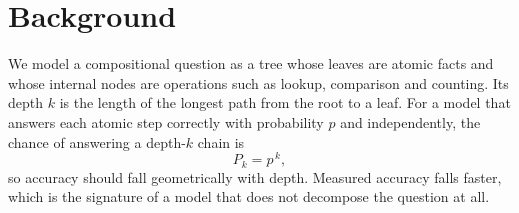 \chapter{Background}
\label{ch:background}

We model a compositional question as a tree whose leaves are atomic facts and whose internal
nodes are operations such as lookup, comparison and counting. Its depth $k$ is the length of the
longest path from the root to a leaf. For a model that answers each atomic step correctly with
probability $p$ and independently, the chance of answering a depth-$k$ chain is
\begin{equation}
  P_k = p^{\,k},
  \label{eq:chain}
\end{equation}
so accuracy should fall geometrically with depth. Measured accuracy falls faster, which is the
signature of a model that does not decompose the question at all.
